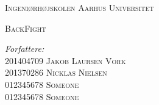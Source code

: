 \begin{titlingpage}
	\center %
	
	\textsc{\LARGE Ingeniørhøjskolen Aarhus Universitet}\\[1.5cm]
	
	

	\begin{vplace}[0.7]
		\textsc{\LARGE BackFight}\\[0.5cm] 		
		
		\vspace{15mm}
	
		\begin{minipage}{0.4\textwidth}
			\begin{flushleft} \large
				
				\emph{Forfattere:}\\ 
				
				201404709 \textsc{Jakob Laursen Vork}\\
				201370286 \textsc{Nicklas Nielsen}\\
				012345678 \textsc{Someone}\\
				012345678 \textsc{Someone}\\
				
			\end{flushleft}
		\end{minipage}

	\end{vplace}	
\end{titlingpage}